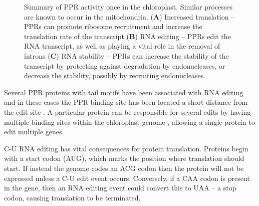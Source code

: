 \begin{figure}
  \begin{center}
  \end{center}
  \caption{Summary of PPR activity once in the chloroplast. Similar processes
    are known to occur in the mitochondria.
    (\textbf{A}) Increased translation -- PPRs can promote ribosome recruitment
      and increase the translation rate of the transcript
    (\textbf{B}) RNA editing -- PPRs edit the RNA transcript, as well as
      playing a vital role in the removal of introns
    (\textbf{C}) RNA stability -- PPRs can increase the stability
      of the transcript by protecting against degradation by endonucleases, or 
      decrease the stability, possibly by recruiting endonucleases.
  }
  \label{fig:PPR_activity}
\end{figure}


Several PPR proteins with tail motifs have been associated with RNA editing and
in these cases the PPR binding site has been located a short distance from the
edit site \citep{Okuda2007,Yagi2013a}.
A particular protein can be responsible for several edits by having multiple
binding sites within the chloroplast genome \citep{Okuda2012}, allowing a single
protein to edit multiple genes.

C-U RNA editing has vital consequences for protein translation.
Proteins begin with a start codon (AUG), which marks the position where
translation should start.
If instead the genome codes an ACG codon then the protein will not be expressed
unless a C-U edit event occurs.
Conversely, if a CAA codon is present in the gene, then an RNA
editing event could convert this to UAA -- a stop codon, causing translation to
be terminated.

